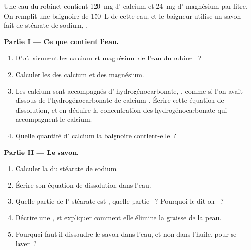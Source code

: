 \begin{problem}
\label{pb:g11:dissolution:1}
Une eau du robinet contient \qty{120}{mg} d' calcium et \qty{24}{mg}
d' magnésium par litre. On remplit une baignoire de \qty{150}{L} de
cette eau, et le baigneur utilise un savon fait de stéarate de sodium,
.

\medskip
\noindent\textbf{Partie I --- Ce que contient l'eau.}
\begin{enumerate}
  \item D'où viennent les  calcium et magnésium de l'eau du
        robinet~?
  \item Calculer les  des  calcium et des
         magnésium.
  \item Les  calcium sont accompagnés d' hydrogénocarbonate,
        , comme si l'on avait dissous de l'hydrogénocarbonate de
        calcium . Écrire cette équation de dissolution, et
        en déduire la concentration des  hydrogénocarbonate qui
        accompagnent le calcium.
  \item Quelle quantité d' calcium la baignoire contient-elle~?
\end{enumerate}

\medskip
\noindent\textbf{Partie II --- Le savon.}
\begin{enumerate}[resume]
  \item Calculer la  du stéarate de sodium.
  \item Écrire son équation de dissolution dans l'eau.
  \item Quelle partie de l' stéarate est , quelle partie
        ~? Pourquoi le dit-on ~?
  \item Décrire une , et expliquer comment elle élimine la
        graisse de la peau.
  \item Pourquoi faut-il dissoudre le savon dans l'eau, et non dans
        l'huile, pour se laver~?
\end{enumerate}


\end{problem}
